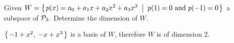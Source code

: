 
\begin{Exercise}[
name={},
title={}, 
difficulty=0,
origin={\cite{YL}}]
Given $W=\\
\mbox{$\left\{\hspace{0.1em}p(x)=a_0+a_1x+a_2x^2+a_3x^3 \;\;\middle|\;\; p(1)=0 \text{ and } p(-1)=0\hspace{0.1em}\right\}$}$ a subspace of $\mathcal{P}_3$. Determine the dimension of $W$.

\end{Exercise}

\begin{Answer}
$\mbox{$\left\{\hspace{0.1em}-1+x^2,\;-x+x^3\hspace{0.1em}\right\}$}$ is a basis of $W$, therefore $W$ is of dimension 2.
\end{Answer}
